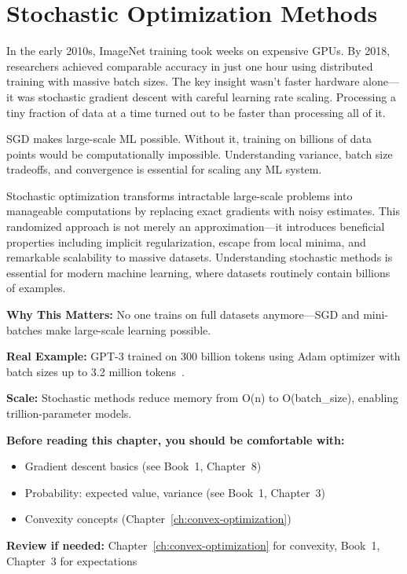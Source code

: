 \documentclass[../../main.tex]{subfiles}
\begin{document}
\chapter{Stochastic Optimization Methods}
\label{ch:stochastic-optimization}

In the early 2010s, ImageNet training took weeks on expensive GPUs. By 2018, researchers achieved comparable accuracy in just one hour using distributed training with massive batch sizes. The key insight wasn't faster hardware alone---it was stochastic gradient descent with careful learning rate scaling. Processing a tiny fraction of data at a time turned out to be faster than processing all of it.

\begin{whycare}
SGD makes large-scale ML possible. Without it, training on billions of data points would be computationally impossible. Understanding variance, batch size tradeoffs, and convergence is essential for scaling any ML system.
\end{whycare}

\begin{keyconcept}
Stochastic optimization transforms intractable large-scale problems into manageable computations by replacing exact gradients with noisy estimates. This randomized approach is not merely an approximation---it introduces beneficial properties including implicit regularization, escape from local minima, and remarkable scalability to massive datasets. Understanding stochastic methods is essential for modern machine learning, where datasets routinely contain billions of examples.
\end{keyconcept}

\begin{realworld}
\textbf{Why This Matters:} No one trains on full datasets anymore---SGD and mini-batches make large-scale learning possible.

\textbf{Real Example:} GPT-3 trained on 300 billion tokens using Adam optimizer with batch sizes up to 3.2 million tokens~\cite{brown2020gpt3}.

\textbf{Scale:} Stochastic methods reduce memory from O(n) to O(batch\_size), enabling trillion-parameter models.
\end{realworld}

\begin{prerequisites}
\textbf{Before reading this chapter, you should be comfortable with:}
\begin{itemize}
    \item Gradient descent basics (see Book~1, Chapter~8)
    \item Probability: expected value, variance (see Book~1, Chapter~3)
    \item Convexity concepts (Chapter~\ref{ch:convex-optimization})
\end{itemize}
\textbf{Review if needed:} Chapter~\ref{ch:convex-optimization} for convexity, Book~1, Chapter~3 for expectations
\end{prerequisites}
\end{document}
